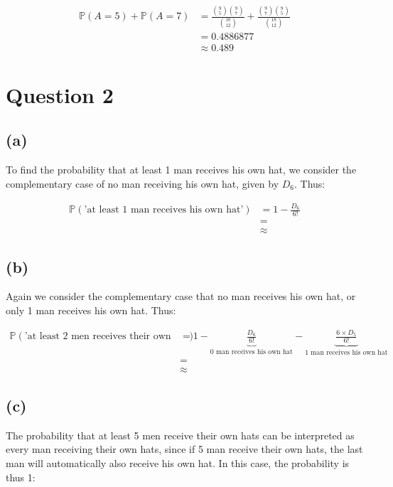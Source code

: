 \documentclass[12pt]{article}
\begin{document}
\begin{align*}
    \mathbb{P}(A = 5) + \mathbb{P}(A = 7) &= \frac{\binom{9}{5}\binom{9}{7}}{\binom{18}{12}} + \frac{\binom{9}{7}\binom{9}{5}}{\binom{18}{12}} \\ 
    &= 0.4886877 \\ 
    &\boxed{\approx 0.489}
\end{align*}

\section*{Question 2}

\subsection*{(a)}

To find the probability that at least 1 man receives his own hat, we consider the complementary case of no man receiving his own hat, given by $D_6$. Thus:

\begin{align*}
    \mathbb{P}(\text{'at least 1 man receives his own hat'}) &= 1 - \frac{D_{6}}{6!} \\ 
    &= \\
    & \boxed{\approx }
\end{align*}

\subsection*{(b)}

Again we consider the complementary case that no man receives his own hat, or only 1 man receives his own hat. Thus:

\begin{align*}
    \mathbb{P}(\text{'at least 2 men receives their own hats'}) &= 1 - \underbrace{\frac{D_{6}}{6!}}_{\text{0 man receives his own hat}} - \underbrace{\frac{6 \times D_{5}}{6!}}_{\text{1 man receives his own hat}} \\ 
    &= \\
    & \boxed{\approx }
\end{align*}

\subsection{(c)}

The probability that at least 5 men receive their own hats can be interpreted as every man receiving their own hats, since if 5 man receive their own hats, the last man will automatically also receive his own hat. In this case, the probability is thus 1:
\end{document}
